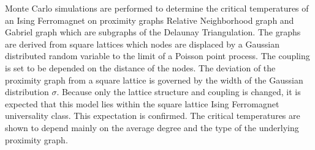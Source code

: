 Monte Carlo simulations are performed
to determine the critical temperatures of an Ising Ferromagnet on
proximity graphs Relative Neighborhood graph and Gabriel graph which are
subgraphs of the Delaunay Triangulation. The graphs are derived
from square lattices which nodes are displaced by a Gaussian distributed
random variable to the limit of a Poisson point process. The coupling is
set to be depended on the distance of
the nodes. The deviation of the proximity graph from a square lattice is
governed by the width of the Gaussian distribution \(\sigma\). Because
only the lattice structure and coupling is changed, it is expected that
this model lies within the square lattice Ising Ferromagnet universality
class. This expectation is confirmed.
The critical temperatures are shown to depend mainly on the average degree
and the type of the underlying proximity graph.
